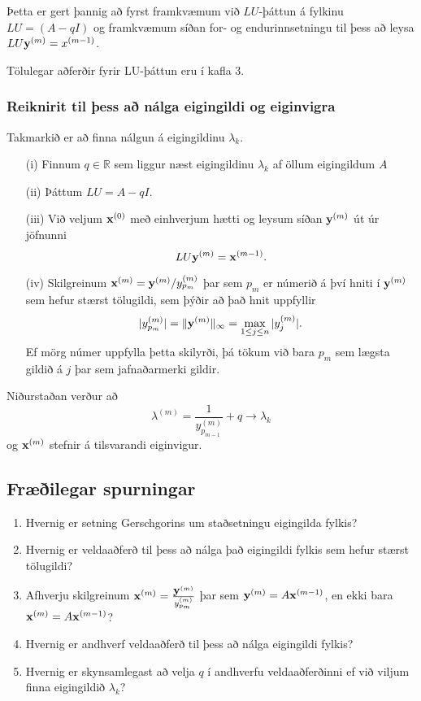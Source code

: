\documentclass[icelandic,a4paper,12pt]{article}
\newcommand{\R}{{\mathbb  R}}
\begin{document}
\pause
\smallskip
Þetta er gert þannig að fyrst framkvæmum við $LU$-þáttun á 
fylkinu $LU=(A-qI)$ og framkvæmum síðan for- og endurinnsetningu
til þess að leysa $LU\mbox{${\bf y}$}^{(m)}=x^{(m-1)}$. 

\pause
\smallskip
Tölulegar aðferðir fyrir LU-þáttun eru í kafla 3.


\subsubsection{Reiknirit til þess að nálga eigingildi og eiginvigra} 
Takmarkið er að finna nálgun á eigingildinu $\lambda_k$.  
  \begin{enumerate}
  \item [(i)] Finnum  $q\in \R$ sem liggur næst eigingildinu
    $\lambda_k$ af öllum eigingildum $A$
\pause
  \item [(ii)] Þáttum $LU=A-qI$.
\pause
  \item [(iii)]Við veljum $\mbox{${\bf x}$}^{(0)}$ með einhverjum hætti og 
leysum  síðan $\mbox{${\bf y}$}^{(m)}$ út úr jöfnunni
$$
LU\mbox{${\bf y}$}^{(m)}=\mbox{${\bf x}$}^{(m-1)}.
$$
\pause
  \item [(iv)] Skilgreinum
$
\mbox{${\bf x}$}^{(m)}={\mbox{${\bf y}$}^{(m)}}/{y_{p_m}^{(m)}}
$
þar sem $p_m$ er númerið á því hniti í $\mbox{${\bf y}$}^{(m)}$ sem hefur stærst
tölugildi, sem þýðir að það hnit uppfyllir
$$
|y_{p_m}^{(m)}|=\|\mbox{${\bf y}$}^{(m)}\|_\infty=\max_{1\leq j\leq n}|y_j^{(m)}|.
$$
Ef mörg númer uppfylla þetta skilyrði, þá tökum við bara $p_m$ sem
lægsta gildið á $j$ þar sem jafnaðarmerki gildir.
  \end{enumerate}


Niðurstaðan verður að 
$$
\lambda^{(m)}=\dfrac 1{y_{p_{m-1}}^{(m)}}+q \to \lambda_k
$$
og $\mbox{${\bf x}$}^{(m)}$ stefnir á tilsvarandi eiginvigur.


\subsection{Fræðilegar spurningar}

\begin{enumerate}
    \item Hvernig er setning Gerschgorins um staðsetningu
    eigingilda fylkis?
  \item Hvernig er veldaaðferð til þess að nálga það
    eigingildi fylkis sem hefur stærst tölugildi?
  \item Afhverju skilgreinum $\mbox{${\bf x}$}^{(m)} = \frac{\mbox{${\bf y}$}^{(m)}}{y_{p_m}^{(m)}}$ þar sem
  $\mbox{${\bf y}$}^{(m)} = A \mbox{${\bf x}$}^{(m-1)}$, en ekki bara $\mbox{${\bf x}$}^{(m)} = A \mbox{${\bf x}$}^{(m-1)}$?
  \item Hvernig er andhverf veldaaðferð til þess að nálga
    eigingildi fylkis? 
  \item Hvernig er skynsamlegast að velja $q$ í andhverfu veldaaðferðinni ef við viljum
finna eigingildið $\lambda_k$?
\end{enumerate}
\end{document}
